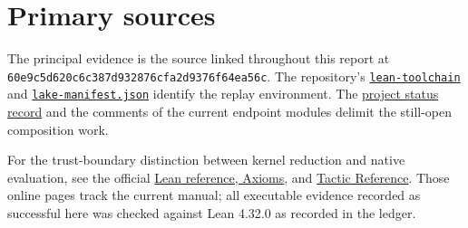 \documentclass[11pt,letterpaper]{article}
\newcommand{\code}[1]{\nolinkurl{#1}}
\newcommand{\snapshot}{\code{60e9c5d620c6c387d932876cfa2d9376f64ea56c}}
\begin{document}
\section*{Primary sources}

The principal evidence is the source linked throughout this report at
\snapshot. The repository's \href{https://github.com/VladimirReshetnikov/ProveIt/blob/60e9c5d620c6c387d932876cfa2d9376f64ea56c/lean-toolchain}{\code{lean-toolchain}}
and \href{https://github.com/VladimirReshetnikov/ProveIt/blob/60e9c5d620c6c387d932876cfa2d9376f64ea56c/lake-manifest.json}{\code{lake-manifest.json}}
identify the replay environment. The
\href{https://github.com/VladimirReshetnikov/ProveIt/blob/60e9c5d620c6c387d932876cfa2d9376f64ea56c/Computability/DiophantineConsistency/STATUS.md}{project status record}
and the comments of the current endpoint modules delimit the still-open
composition work.

For the trust-boundary distinction between kernel reduction and native
evaluation, see the official
\href{https://lean-lang.org/doc/reference/latest/Axioms/}{Lean reference, Axioms},
and \href{https://lean-lang.org/doc/reference/latest/Tactic-Proofs/Tactic-Reference/}{Tactic Reference}.
Those online pages track the current manual; all executable evidence
recorded as successful here was checked against Lean 4.32.0 as recorded
in the ledger.
\end{document}
